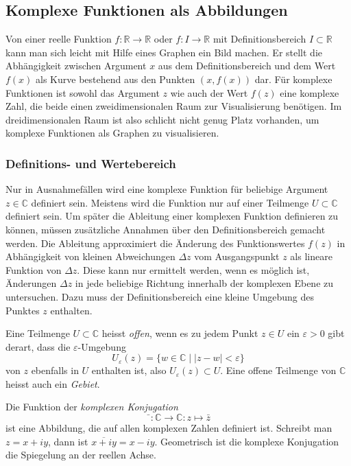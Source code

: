 %
%
%
\subsection{Komplexe Funktionen als Abbildungen}
Von einer reelle Funktion
$f\colon \mathbb{R}\to\mathbb{R}$
oder
$f\colon I\to\mathbb{R}$ mit Definitionsbereich $I\subset\mathbb{R}$
kann man sich leicht mit Hilfe eines Graphen ein Bild machen.
Er stellt die Abhängigkeit zwischen Argument $x$ aus dem
Definitionsbereich und dem Wert $f(x)$ als Kurve bestehend aus
den Punkten $(x,f(x))$ dar.
Für komplexe Funktionen ist sowohl das Argument $z$ wie auch der
Wert $f(z)$ eine komplexe Zahl, die beide einen zweidimensionalen
Raum zur Visualisierung benötigen.
Im dreidimensionalen Raum ist also schlicht nicht genug Platz vorhanden,
um komplexe Funktionen als Graphen zu visualisieren.

%
%
\subsubsection{Definitions- und Wertebereich}
Nur in Ausnahmefällen wird eine komplexe Funktion für beliebige Argument
$z\in\mathbb{C}$ definiert sein.
Meistens wird die Funktion nur auf einer Teilmenge
$U\subset \mathbb{C}$ definiert sein.
Um später die Ableitung einer komplexen Funktion definieren zu können,
müssen zusätzliche Annahmen über den Definitionsbereich gemacht werden.
Die Ableitung approximiert die Änderung des Funktionswertes $f(z)$
in Abhängigkeit von kleinen Abweichungen $\Delta z$ vom Ausgangspunkt $z$
als lineare Funktion von $\Delta z$.
Diese kann nur ermittelt werden, wenn es möglich ist, Änderungen
$\Delta z$ in jede beliebige Richtung innerhalb der komplexen Ebene
zu untersuchen.
Dazu muss der Definitionsbereich eine kleine Umgebung des Punktes $z$
enthalten.

\begin{definition}
Eine Teilmenge $U\subset \mathbb{C}$ heisst \emph{offen}, wenn es zu
%
jedem Punkt $z\in U$ ein $\varepsilon > 0$ gibt derart, dass die
$\varepsilon$-Umgebung
\[
U_{\varepsilon}(z)
=
\{
w\in\mathbb{C}
\mid
|z-w|<\varepsilon
\}
\]
von $z$ ebenfalls in $U$ enthalten ist, also $U_\varepsilon(z)\subset U$.
Eine offene Teilmenge von $\mathbb{C}$ heisst auch ein \emph{Gebiet}.
%
\end{definition}

\begin{beispiel}
Die Funktion der \emph{komplexen Konjugation}
%
\[
\bar{\phantom{o}}
\colon
\mathbb{C} \to \mathbb{C}
:
z\mapsto \bar{z}
\]
ist eine Abbildung, die auf allen komplexen Zahlen definiert ist.
Schreibt man $z=x+iy$, dann ist $\overline{x+iy}=x-iy$.
Geometrisch ist die komplexe Konjugation die Spiegelung an der
reellen Achse.
\end{beispiel}

